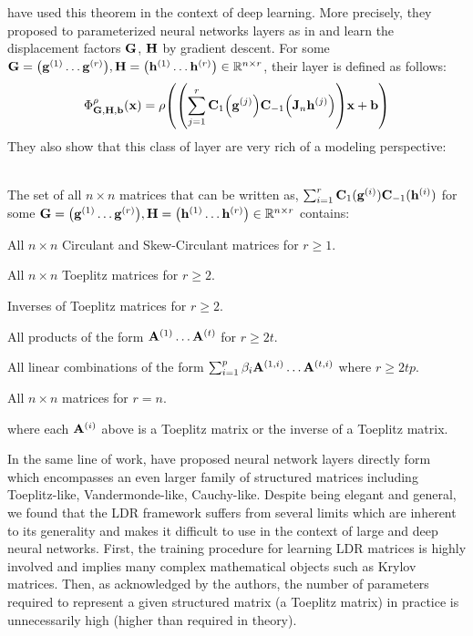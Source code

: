 \noindent
\citet{sindhwani2015structured} have used this theorem in the context of deep learning.
More precisely, they proposed to parameterized neural networks layers as in  and learn the displacement factors $\mathbf{G}$, $\mathbf{H}$ by gradient descent. 
For some $\Gmat = \leftmat \gvec^{(1)} \ldots \gvec^{(r)} \rightmat, \Hmat = \leftmat \hvec^{(1)} \ldots \hvec^{(r)} \rightmat \in \Rbb^{n \times r}$, their layer is defined as follows:
\begin{equation}
  \Phi^\rho_{\Gmat, \Hmat, \bvec}(\xvec) = \rho\left( \left(\sum_{j=1}^{r} \Cmat_1\left(\gvec^{(j)}\right) \Cmat_{-1}\left(\Jmat_n \hvec^{(j)}\right) \right) \xvec + \bvec \right)
\end{equation}
\noindent
They also show that this class of layer are very rich of a modeling perspective:
\begin{theorem} ~\\
  The set of all $n \times n$ matrices that can be written as, $\sum_{i=1}^{r} \mathbf{C}_1(\mathbf{g}^{(i)}) \mathbf{C}_{-1}(\mathbf{h}^{(i)})$
  for some $\Gmat = \leftmat \gvec^{(1)} \ldots \gvec^{(r)} \rightmat,
  \Hmat = \leftmat \hvec^{(1)} \ldots \hvec^{(r)} \rightmat \in \Rbb^{n \times r}$ contains:
  \begin{compactitem}
    \item All $n \times n$ Circulant and Skew-Circulant matrices for $r \geq 1$.
    \item All $n \times n$ Toeplitz matrices for $r \geq 2$.
    \item Inverses of Toeplitz matrices for $r \geq 2$.
    \item All products of the form $\mathbf{A}^{(1)} \ldots \mathbf{A}^{(t)}$ for $r \geq 2t$.
    \item All linear combinations of the form $\sum_{i=1}^p \beta_i \mathbf{A}^{(1, i)} \ldots \mathbf{A}^{(t, i)}$ where $r \geq 2tp$.
    \item All $n\times n$ matrices for $r=n$.
  \end{compactitem}
  where each $\mathbf{A}^{(i)}$ above is a Toeplitz matrix or the inverse of a Toeplitz matrix. 
\end{theorem}
\noindent
In the same line of work, \citet{thomas2018learning} have proposed neural network layers directly form  which encompasses an even larger family of structured matrices including Toeplitz-like, Vandermonde-like, Cauchy-like.
Despite being elegant and general, we found that the LDR framework suffers from several limits which are inherent to its generality and makes it difficult to use in the context of large and deep neural networks.
First, the training procedure for learning LDR matrices is highly involved and implies many complex mathematical objects such as Krylov matrices.
Then, as acknowledged by the authors, the number of parameters required to represent a given structured matrix (a Toeplitz matrix) in practice is unnecessarily high (higher than required in theory). 

